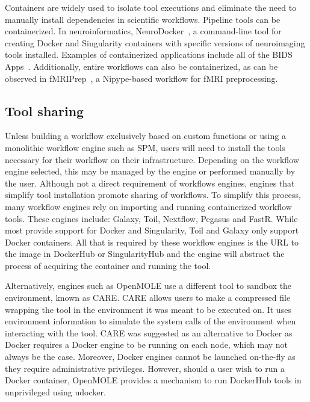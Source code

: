            Containers are widely used to isolate tool executions and eliminate
            the need to manually install dependencies in scientific workflows.
            Pipeline tools can be containerized. In neuroinformatics,
            NeuroDocker~\cite{neurodoc}, a command-line tool for creating Docker
            and Singularity containers with specific versions of neuroimaging
            tools installed. Examples of containerized applications include all
            of the BIDS Apps~\cite{10.1371/journal.pcbi.1005209}. Additionally,
            entire workflows can also be containerized, as can be observed in
            fMRIPrep~\cite{Esteban306951}, a Nipype-based workflow for fMRI
            preprocessing.
            
       \subsection{Tool sharing}\label{sharing}

            Unless building a workflow exclusively based on custom functions or
            using a monolithic workflow engine such as SPM, users will need to
            install the tools necessary for their workflow on their
            infrastructure. Depending on the workflow engine selected, this may
            be managed by the engine or performed manually by the user. Although
            not a direct requirement of workflows engines, engines that simplify
            tool installation promote sharing of workflows. To simplify this
            process, many workflow engines rely on importing and running
            containerized workflow tools. These engines include: Galaxy, Toil,
            Nextflow, Pegasus and FastR. While most provide support for Docker
            and Singularity, Toil and Galaxy only support Docker containers. All
            that is required by these workflow engines is the URL to the image
            in DockerHub or SingularityHub and the engine will abstract the
            process of acquiring the container and running the tool.

            Alternatively, engines such as OpenMOLE use a different tool to
            sandbox the environment, known as CARE. CARE allows users to make a
            compressed file wrapping the tool in the environment it was meant to
            be executed on. It uses environment information to simulate the
            system calls of the environment when interacting with the tool. CARE
            was suggested as an alternative to Docker as Docker requires a
            Docker engine to be running on each node, which may not always be
            the case. Moreover, Docker engines cannot be launched on-the-fly as
            they require administrative privileges. However, should a user wish
            to run a Docker container, OpenMOLE provides a mechanism to run
            DockerHub tools in unprivileged using udocker.

